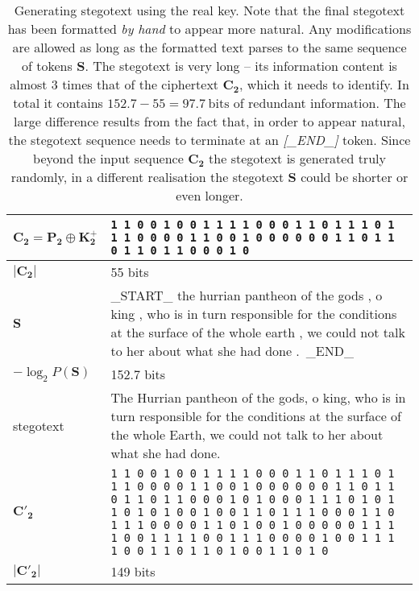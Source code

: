 \documentclass[draft]{IIBproject}
\DeclareRobustCommand{\ngram}[1]{\emph{[#1]}}
\begin{document}
\begin{table}[h]
	\centering
	\begin{tabular}{m{3cm} m{12cm}}
	\centering $\mathbf{C_2} = \mathbf{P_2} \oplus \mathbf{K^+_2}$ & \footnotesize \texttt{1 1 0 0 1 0 0 1 1 1 1 0 0 0 1 1 0 1 1 1 0 1 1 1 0 0 0 0 1 1 0 0 1 0 0 0 0 0 0 1 1 0 1 1 0 1 1 0 1 1 0 0 0 1 0} \\ \hline
	\centering $| \mathbf{C_2} |$ & 55 bits \\ \hline
	\centering $\mathbf S$ & \_START\_ the hurrian pantheon of the gods , o king , who is in turn responsible for the conditions at the surface of the whole earth , we could not talk to her about what she had done .\ \_END\_ \\ \hline
	\centering $-\log_2 P(\mathbf S)$ & 152.7 bits \\ \hline
	\centering stegotext & The Hurrian pantheon of the gods, o king, who is in turn responsible for the conditions at the surface of the whole Earth, we could not talk to her about what she had done. \\ \hline
	\centering $\mathbf{C'_2}$ & \footnotesize \texttt{1 1 0 0 1 0 0 1 1 1 1 0 0 0 1 1 0 1 1 1 0 1 1 1 0 0 0 0 1 1 0 0 1 0 0 0 0 0 0 1 1 0 1 1 0 1 1 0 1 1 0 0 0 1 0 1 0 0 0 1 1 1 0 1 0 1 1 0 1 0 1 0 0 1 0 0 1 1 0 1 1 1 0 0 0 1 1 0 1 1 1 0 0 0 0 1 1 0 1 0 0 1 0 0 0 0 0 1 1 1 1 0 0 1 1 1 1 0 0 1 1 1 0 0 0 0 1 0 0 1 1 1 1 0 0 1 1 0 1 1 0 1 0 0 1 1 0 1 0} \\ \hline
	\centering $| \mathbf{C'_2} |$ & 149 bits
	\end{tabular}
	\caption{\label{tab:results_stegotext}Generating stegotext using the real key. Note that the final stegotext has been formatted \emph{by hand} to appear more natural. Any modifications are allowed as long as the formatted text parses to the same sequence of tokens $\mathbf S$. The stegotext is very long -- its information content is almost 3 times that of the ciphertext $\mathbf{C_2}$, which it needs to identify. In total it contains $152.7 - 55 = 97.7~\text{bits}$ of redundant information. The large difference results from the fact that, in order to appear natural, the stegotext sequence needs to terminate at an \ngram{\_END\_} token. Since beyond the input sequence $\mathbf{C_2}$ the stegotext is generated truly randomly, in a different realisation the stegotext $\mathbf S$ could be shorter or even longer.}
\end{table}
\end{document}
